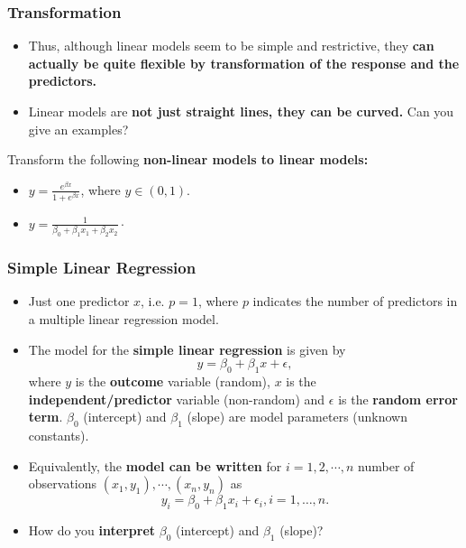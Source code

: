 \documentclass[10pt]{beamer} %
\begin{document}
\begin{frame}
\frametitle{Transformation}

\begin{itemize}

	\item Thus, although linear models seem to be simple and restrictive, they \textbf{can actually be quite flexible by transformation of the response and the predictors.}
	\bigskip
	\item Linear models are \textbf{not just straight lines, they can be curved.} Can you give an examples?
\end{itemize}
		\vspace{0.5cm}
		
	Transform the following \textbf{non-linear models to linear models:}
	\vspace{0.25cm}
	\begin{itemize}
		\item $y = \frac{e^{\beta x}}{1 + e^{\beta x}}$, where $y \in (0,1)$.
		\vspace{0.5cm}
		
		\item $y = \frac{1}{\beta_0 + \beta_1x_1 + \beta_2x_2}\cdot $
		
	\end{itemize}	

\end{frame}




\begin{frame}
	\frametitle{Simple Linear Regression}
	\begin{itemize}
		\item Just one predictor $x$, i.e. $p=1$, where $p$ indicates the number of predictors in a multiple linear regression model. 
		\vspace{0.5cm}
		
		\item The model for the \textbf{simple linear regression} is given by
		\textbf{$$y=\beta_0 + \beta_1x + \epsilon,$$} where $y$ is the \textbf{outcome} variable (random), $x$ is the \textbf{independent/predictor} variable (non-random) and $\epsilon$ is the \textbf{random error term}. $\beta_0$ (intercept) and $\beta_1$ (slope) are model parameters (unknown constants). 
		\vspace{0.5cm}
		
		\item Equivalently, the \textbf{model can be written} for $i=1,2,\cdots, n$ number of observations $(x_1, y_1), \cdots, (x_n, y_n)$ as
		$$y_i = \beta_0 + \beta_1x_i + \epsilon_i, i = 1,\ldots,n.$$
		\vspace{0.01cm}
		
		\item How do you \textbf{interpret} $\beta_0$ (intercept) and $\beta_1$ (slope)?
	\end{itemize}
\end{frame}
\end{document}
